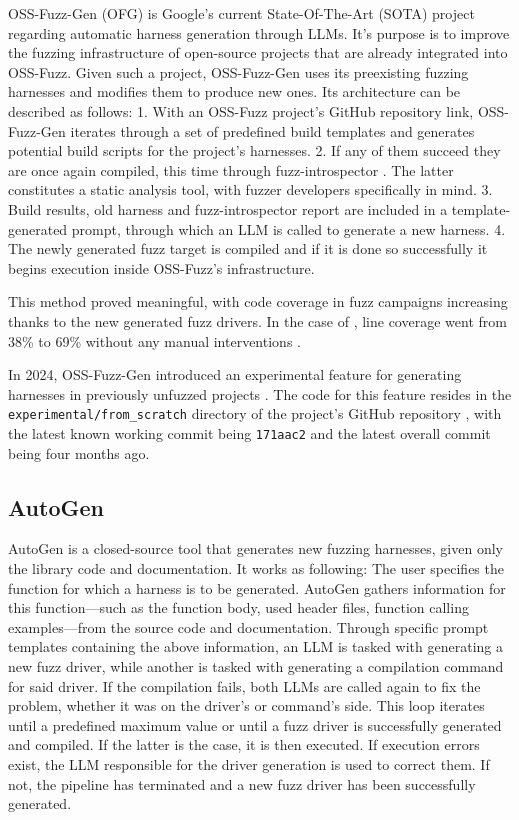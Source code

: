 \documentclass[
  a4paper,
]{scrreprt}
\theoremstyle{definition}
\theoremstyle{remark}
\begin{document}
OSS-Fuzz-Gen (OFG) \autocite{liu2023,oss-fuzz-gen} is Google's current
State-Of-The-Art (SOTA) project regarding automatic harness generation
through LLMs. It's purpose is to improve the fuzzing infrastructure of
open-source projects that are already integrated into OSS-Fuzz. Given
such a project, OSS-Fuzz-Gen uses its preexisting fuzzing harnesses and
modifies them to produce new ones. Its architecture can be described as
follows: 1. With an OSS-Fuzz project's GitHub repository link,
OSS-Fuzz-Gen iterates through a set of predefined build templates and
generates potential build scripts for the project's harnesses. 2. If any
of them succeed they are once again compiled, this time through
fuzz-introspector \autocite{fuzz-introspector}. The latter constitutes a
static analysis tool, with fuzzer developers specifically in mind. 3.
Build results, old harness and fuzz-introspector report are included in
a template-generated prompt, through which an LLM is called to generate
a new harness. 4. The newly generated fuzz target is compiled and if it
is done so successfully it begins execution inside OSS-Fuzz's
infrastructure.

This method proved meaningful, with code coverage in fuzz campaigns
increasing thanks to the new generated fuzz drivers. In the case of
\autocite{thomason2025}, line coverage went from 38\% to 69\% without
any manual interventions \autocite{liu2023}.

In 2024, OSS-Fuzz-Gen introduced an experimental feature for generating
harnesses in previously unfuzzed projects
\autocite{oss-fuzzmaintainers2024}. The code for this feature resides in
the \texttt{experimental/from\_scratch} directory of the project's
GitHub repository \autocite{oss-fuzz-gen}, with the latest known working
commit being \texttt{171aac2} and the latest overall commit being four
months ago.

\subsection{AutoGen}\label{autogen}

AutoGen \autocite{sun2024} is a closed-source tool that generates new
fuzzing harnesses, given only the library code and documentation. It
works as following: The user specifies the function for which a harness
is to be generated. AutoGen gathers information for this function---such
as the function body, used header files, function calling
examples---from the source code and documentation. Through specific
prompt templates containing the above information, an LLM is tasked with
generating a new fuzz driver, while another is tasked with generating a
compilation command for said driver. If the compilation fails, both LLMs
are called again to fix the problem, whether it was on the driver's or
command's side. This loop iterates until a predefined maximum value or
until a fuzz driver is successfully generated and compiled. If the
latter is the case, it is then executed. If execution errors exist, the
LLM responsible for the driver generation is used to correct them. If
not, the pipeline has terminated and a new fuzz driver has been
successfully generated.
\end{document}
